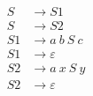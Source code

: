 \begin{align*}
S &\rightarrow S1 \\
S &\rightarrow S2 \\
S1 &\rightarrow a\ b\ S\ c \\
S1 &\rightarrow \varepsilon \\
S2 &\rightarrow a\ x\ S\ y \\
S2 &\rightarrow \varepsilon \\
\end{align*}